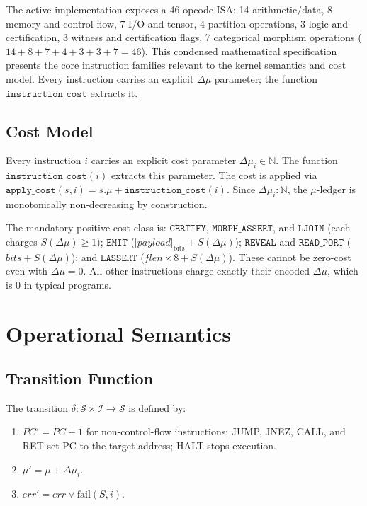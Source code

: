\documentclass[11pt, a4paper]{report}
\theoremstyle{definition}
\theoremstyle{plain}
\newcommand{\N}{\mathbb{N}}
\newcommand{\Sspace}{\mathcal{S}}
\newcommand{\Ispace}{\mathcal{I}}
\begin{document}
The active implementation exposes a 46-opcode ISA: 14 arithmetic/data, 8 memory and control flow, 7 I/O and tensor, 4 partition operations, 3 logic and certification, 3 witness and certification flags, 7 categorical morphism operations ($14+8+7+4+3+3+7=46$). This condensed mathematical specification presents the core instruction families relevant to the kernel semantics and cost model. Every instruction carries an explicit $\Delta\mu$ parameter; the function $\texttt{instruction\_cost}$ extracts it.

\section{Cost Model}
Every instruction $i$ carries an explicit cost parameter $\Delta\mu_i \in \N$. The function $\texttt{instruction\_cost}(i)$ extracts this parameter. The cost is applied via $\texttt{apply\_cost}(s, i) = s.\mu + \texttt{instruction\_cost}(i)$. Since $\Delta\mu_i : \N$, the $\mu$-ledger is monotonically non-decreasing by construction.

The mandatory positive-cost class is: $\texttt{CERTIFY}$, $\texttt{MORPH\_ASSERT}$, and $\texttt{LJOIN}$ (each charges $S(\Delta\mu) \geq 1$); $\texttt{EMIT}$ ($|\mathit{payload}|_{\mathrm{bits}} + S(\Delta\mu)$); $\texttt{REVEAL}$ and $\texttt{READ\_PORT}$ ($\mathit{bits} + S(\Delta\mu)$); and $\texttt{LASSERT}$ ($\mathit{flen} \times 8 + S(\Delta\mu)$). These cannot be zero-cost even with $\Delta\mu = 0$. All other instructions charge exactly their encoded $\Delta\mu$, which is 0 in typical programs.

\chapter{Operational Semantics}

\section{Transition Function}
The transition $\delta: \Sspace \times \Ispace \to \Sspace$ is defined by:
\begin{enumerate}
    \item $\mathit{PC}' = \mathit{PC} + 1$ for non-control-flow instructions; JUMP, JNEZ, CALL, and RET set PC to the target address; HALT stops execution.
    \item $\mu' = \mu + \Delta\mu_i$.
    \item $\mathit{err}' = \mathit{err} \lor \mathrm{fail}(S, i)$.
\end{enumerate}
\end{document}
